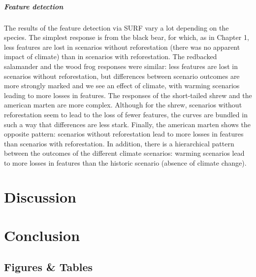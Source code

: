 {\subparagraph*{\textit{Feature detection}} The results of the feature detection via SURF vary a lot depending on the species. The simplest response is from the black bear, for which, as in Chapter 1, less features are lost in scenarios without reforestation (there was no apparent impact of climate) than in scenarios with reforestation. The redbacked salamander and the wood frog responses were similar: less features are lost in scenarios without reforestation, but differences between scenario outcomes are more strongly marked and we see an effect of climate, with warming scenarios leading to more losses in features. The responses of the short-tailed shrew and the american marten are more complex. Although for the shrew, scenarios without reforestation seem to lead to the loss of fewer features, the curves are bundled in such a way that differences are less stark. Finally, the american marten shows the opposite pattern: scenarios without reforestation lead to more losses in features than scenarios with reforestation. In addition, there is a hierarchical pattern between the outcomes of the different climate scenarios: warming scenarios lead to more losses in features than the historic scenario (absence of climate change).\\

\section{Discussion}


\section{Conclusion}



\newpage
\begin{center}
\section*{Figures \& Tables}
\end{center}


}
